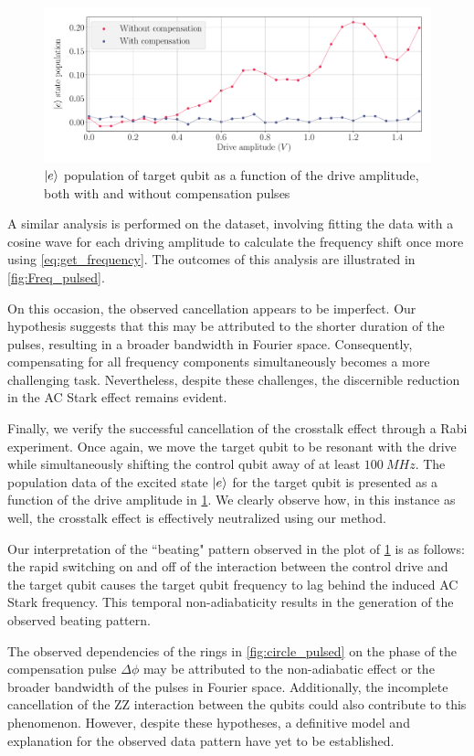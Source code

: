 \begin{figure}
    \centering
    \includegraphics[width=0.75\linewidth]{Images//Chap2.0/Rabi_pulsed_cancellation.pdf}
    \caption{$\ket{e}$ population of target qubit as a function of the drive amplitude, both with and without compensation pulses}
    \label{fig:Rabi_canc_pulsed}
\end{figure}

A similar analysis is performed on the dataset, involving fitting the data with a cosine wave for each driving amplitude to calculate the frequency shift once more using \cref{eq:get_frequency}.
The outcomes of this analysis are illustrated in \cref{fig:Freq_pulsed}.

On this occasion, the observed cancellation appears to be imperfect.
Our hypothesis suggests that this may be attributed to the shorter duration of the pulses, resulting in a broader bandwidth in Fourier space.
Consequently, compensating for all frequency components simultaneously becomes a more challenging task. 
Nevertheless, despite these challenges, the discernible reduction in the AC Stark effect remains evident.

Finally, we verify the successful cancellation of the crosstalk effect through a Rabi experiment.
Once again, we move the target qubit to be resonant with the drive while simultaneously shifting the control qubit away of at least $\SI{100}{MHz}$.
The population data of the excited state $\ket{e}$ for the target qubit is presented as a function of the drive amplitude in \cref{fig:Rabi_canc_pulsed}.
We clearly observe how, in this instance as well, the crosstalk effect is effectively neutralized using our method.

Our interpretation of the “beating" pattern observed in the plot of \cref{fig:Rabi_canc_pulsed} is as follows: the rapid switching on and off of the interaction between the control drive and the target qubit causes the target qubit frequency to lag behind the induced AC Stark frequency.
This temporal non-adiabaticity results in the generation of the observed beating pattern.

The observed dependencies of the rings in \cref{fig:circle_pulsed} on the phase of the compensation pulse $\Delta \phi$ may be attributed to the non-adiabatic effect or the broader bandwidth of the pulses in Fourier space. 
Additionally, the incomplete cancellation of the ZZ interaction between the qubits could also contribute to this phenomenon.
However, despite these hypotheses, a definitive model and explanation for the observed data pattern have yet to be established.